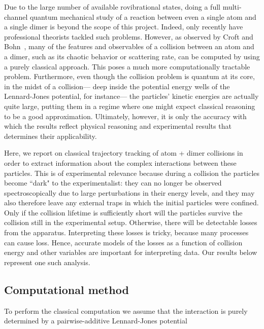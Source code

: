 \documentclass[%
 reprint,
 amsmath,amssymb,
 aps,
 nofootinbib
]{revtex4-1}
\begin{document}
Due to the large number of available rovibrational states, doing a full multi-channel quantum mechanical study of a reaction between even a single atom and a single dimer is beyond the scope of this project. Indeed, only recently have professional theorists tackled such problems. However, as observed by Croft and Bohn~\cite{bohn2014}, many of the features and observables of a collision between an atom and a dimer, such as its chaotic behavior or scattering rate, can be computed by using a purely classical approach. This poses a much more computationally tractable problem. Furthermore, even though the collision problem is quantum at its core, in the midst of a collision--- deep inside the potential energy wells of the Lennard-Jones potential, for instance--- the particles' kinetic energies are actually quite large, putting them in a regime where one might expect classical reasoning to be a good approximation. Ultimately, however, it is only the accuracy with which the results reflect physical reasoning and experimental results that determines their applicability.

Here, we report on classical trajectory tracking of atom + dimer collisions in order to extract information about the complex interactions between these particles. This is of experimental relevance because during a collision the particles become ``dark" to the experimentalist: they can no longer be observed spectroscopically due to large perturbations in their energy levels, and they may also therefore leave any external traps in which the initial particles were confined. Only if the collision lifetime is sufficiently short will the particles survive the collision still in the experimental setup. Otherwise, there will be detectable losses from the apparatus. Interpreting these losses is tricky, because many processes can cause loss. Hence, accurate models of the losses as a function of collision energy and other variables are important for interpreting data. Our results below represent one such analysis.

\subsection{\label{sec:level2}Computational method}

To perform the classical computation we assume that the interaction is purely determined by a pairwise-additive Lennard-Jones potential
\end{document}
